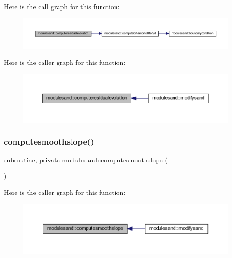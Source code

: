 Here is the call graph for this function\+:\nopagebreak
\begin{figure}[H]
\begin{center}
\leavevmode
\includegraphics[width=350pt]{namespacemodulesand_a4577ec7b0d16f959a488db5280c61154_cgraph}
\end{center}
\end{figure}
Here is the caller graph for this function\+:\nopagebreak
\begin{figure}[H]
\begin{center}
\leavevmode
\includegraphics[width=350pt]{namespacemodulesand_a4577ec7b0d16f959a488db5280c61154_icgraph}
\end{center}
\end{figure}
\mbox{\label{namespacemodulesand_a2490457b0368770e3389caa5b86fbcec}} 
\subsubsection{\texorpdfstring{computesmoothslope()}{computesmoothslope()}}
{\footnotesize\ttfamily subroutine, private modulesand\+::computesmoothslope (\begin{DoxyParamCaption}{ }\end{DoxyParamCaption})\hspace{0.3cm}{\ttfamily [private]}}

Here is the caller graph for this function\+:\nopagebreak
\begin{figure}[H]
\begin{center}
\leavevmode
\includegraphics[width=350pt]{namespacemodulesand_a2490457b0368770e3389caa5b86fbcec_icgraph}
\end{center}
\end{figure}
\mbox{\label{namespacemodulesand_a59ce9cc4ddca10eedae7fbc2ca0c2583}} 
